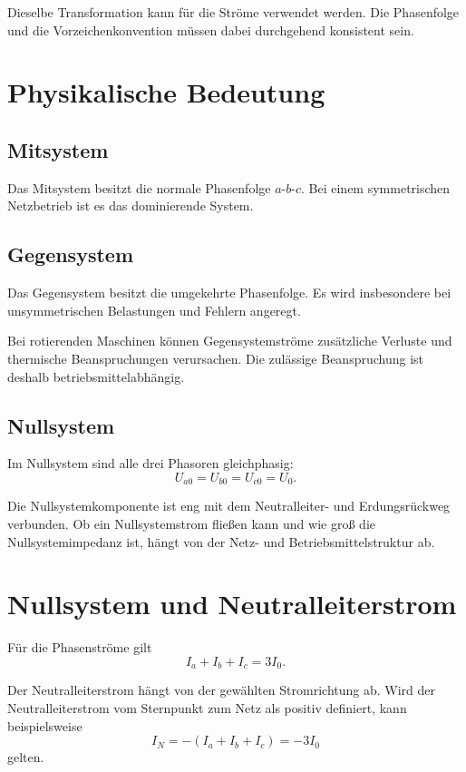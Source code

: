 Dieselbe Transformation kann für die Ströme verwendet werden. Die
Phasenfolge und die Vorzeichenkonvention müssen dabei durchgehend
konsistent sein.

\section{Physikalische Bedeutung}

\subsection{Mitsystem}

Das Mitsystem besitzt die normale Phasenfolge \(a\)-\(b\)-\(c\).
Bei einem symmetrischen Netzbetrieb ist es das dominierende System.

\subsection{Gegensystem}

Das Gegensystem besitzt die umgekehrte Phasenfolge. Es wird insbesondere
bei unsymmetrischen Belastungen und Fehlern angeregt.

Bei rotierenden Maschinen können Gegensystemströme zusätzliche Verluste
und thermische Beanspruchungen verursachen. Die zulässige Beanspruchung
ist deshalb betriebsmittelabhängig.

\subsection{Nullsystem}

Im Nullsystem sind alle drei Phasoren gleichphasig:
\[
  U_{a0}=U_{b0}=U_{c0}=U_0.
\]

Die Nullsystemkomponente ist eng mit dem Neutralleiter- und Erdungsrückweg
verbunden. Ob ein Nullsystemstrom fließen kann und wie groß die
Nullsystemimpedanz ist, hängt von der Netz- und Betriebsmittelstruktur ab.

\section{Nullsystem und Neutralleiterstrom}

Für die Phasenströme gilt
\[
  I_a+I_b+I_c=3I_0.
\]

Der Neutralleiterstrom hängt von der gewählten Stromrichtung ab. Wird
der Neutralleiterstrom vom Sternpunkt zum Netz als positiv definiert,
kann beispielsweise
\[
  I_N=-(I_a+I_b+I_c)=-3I_0
\]
gelten.

